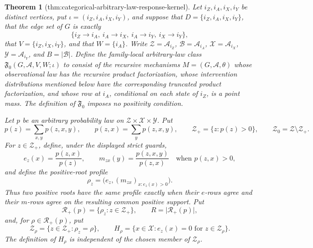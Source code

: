 \documentclass{article}
\newtheorem{theorem}{Theorem}
\begin{document}
\begin{theorem}[thm:categorical-arbitrary-law-response-kernel]\label{thm:categorical-arbitrary-law-response-kernel}
Let \(i_Z,i_A,i_X,i_Y\) be distinct vertices, put
\(\iota=(i_Z,i_A,i_X,i_Y)\), and suppose that
\(D=\{i_Z,i_A,i_X,i_Y\}\), that the edge set of \(G\) is exactly
\[
 \{i_Z\mathbin{\to}i_A,\ i_A\mathbin{\to}i_X,
   \ i_A\mathbin{\to}i_Y,\ i_X\mathbin{\to}i_Y\},
\]
that \(V=\{i_Z,i_X,i_Y\}\), and that \(W=\{i_A\}\).  Write
\(\mathcal Z=\mathcal A_{i_Z}\), \(\mathcal B=\mathcal A_{i_A}\),
\(\mathcal X=\mathcal A_{i_X}\), \(\mathcal Y=\mathcal A_{i_Y}\),
and \(B=\lvert\mathcal B\rvert\).  Define the family-local
arbitrary-law class \(\mathfrak F_0(G,\mathcal A,V,W;\iota)\) to consist
of the recursive mechanisms \(M=(G,\mathcal A,\theta)\) whose
observational law has the recursive product factorization, whose
intervention distributions mentioned below have the corresponding
truncated product factorization, and whose row at \(i_A\), conditional on
each state of \(i_Z\), is a point mass.  The definition of
\(\mathfrak F_0\) imposes no positivity condition.

Let \(p\) be an arbitrary probability law on
\(\mathcal Z\times\mathcal X\times\mathcal Y\).  Put
\[
 p(z)=\sum_{x,y}p(z,x,y),\qquad
 p(z,x)=\sum_y p(z,x,y),\qquad
 \mathcal Z_+=\{z:p(z)>0\},\qquad
 \mathcal Z_0=\mathcal Z\setminus\mathcal Z_+.
\]
For \(z\in\mathcal Z_+\), define, under the displayed strict guards,
\[
 e_z(x)=\frac{p(z,x)}{p(z)},\qquad
 m_{zx}(y)=\frac{p(z,x,y)}{p(z,x)}
 \quad\text{when }p(z,x)>0,
\]
and define the positive-root profile
\[
 \rho_z=\bigl(e_z,(m_{zx})_{x:e_z(x)>0}\bigr).
\]
Thus two positive roots have the same profile exactly when their
\(e\)-rows agree and their \(m\)-rows agree on the resulting common
positive support.  Put
\[
 \mathcal R_+(p)=\{\rho_z:z\in\mathcal Z_+\},\qquad
 R=\lvert\mathcal R_+(p)\rvert,
\]
and, for \(\rho\in\mathcal R_+(p)\), put
\[
 \mathcal Z_\rho=\{z\in\mathcal Z_+:\rho_z=\rho\},\qquad
 H_\rho=\{x\in\mathcal X:e_z(x)=0\text{ for }z\in\mathcal Z_\rho\}.
\]
The definition of \(H_\rho\) is independent of the chosen member of
\(\mathcal Z_\rho\).


\end{theorem}
\end{document}
